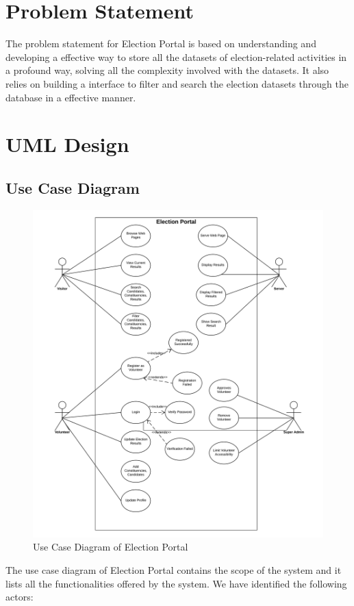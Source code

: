 \documentclass[12pt, a4paper, titlepage]{article}
\begin{document}
\section{Problem Statement}
The problem statement for Election Portal is based on understanding and developing a effective way to store all the datasets of election-related activities in a profound way, solving all the complexity involved with the datasets. It also relies on building a interface to filter and search the election datasets through the database in a effective manner.

\newpage
\section{UML Design}
\subsection{Use Case Diagram}
\begin{figure}[ht]
	\includegraphics[scale=0.6]{election_portal_use_case_diagram.png}
	\caption{Use Case Diagram of Election Portal}
\end{figure}
The use case diagram of Election Portal contains the scope of the system and it lists all the functionalities offered by the system. We have identified the following actors:
\end{document}
